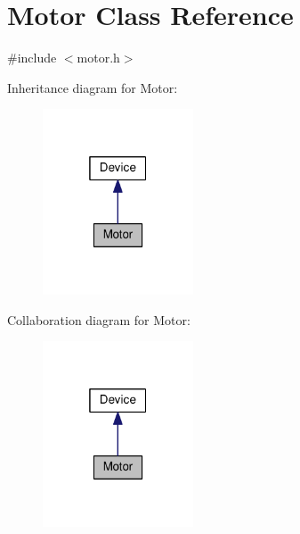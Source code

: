\hypertarget{class_motor}{}\section{Motor Class Reference}
\label{class_motor}


{\ttfamily \#include $<$motor.\+h$>$}



Inheritance diagram for Motor\+:\nopagebreak
\begin{figure}[H]
\begin{center}
\leavevmode
\includegraphics[width=127pt]{class_motor__inherit__graph}
\end{center}
\end{figure}


Collaboration diagram for Motor\+:\nopagebreak
\begin{figure}[H]
\begin{center}
\leavevmode
\includegraphics[width=127pt]{class_motor__coll__graph}
\end{center}
\end{figure}
